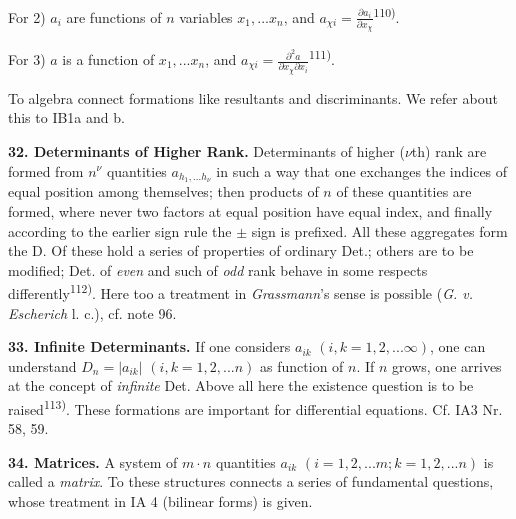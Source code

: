 \thispagestyle{fancy}

\vspace{0.5cm}

For 2) $a_i$ are functions of $n$ variables $x_1,...x_n$, and $a_{\chi i} = \frac{\partial a_i}{\partial x_\chi}$\textsuperscript{110)}.

For 3) $a$ is a function of $x_1,...x_n$, and $a_{\chi i} = \frac{\partial^2 a}{\partial x_\chi \partial x_i}$\textsuperscript{111)}.

To algebra connect formations like resultants and discriminants. We refer about this to IB1a and b.

\vspace{0.1cm}

\textbf{32. Determinants of Higher Rank.} Determinants of higher ($\nu$th) rank are formed from $n^\nu$ quantities $a_{h_1,...h_\nu}$ in such a way that one exchanges the indices of equal position among themselves; then products of $n$ of these quantities are formed, where never two factors at equal position have equal index, and finally according to the earlier sign rule the $\pm$ sign is prefixed. All these aggregates form the D. Of these hold a series of properties of ordinary Det.; others are to be modified; Det. of \textit{even} and such of \textit{odd} rank behave in some respects differently\textsuperscript{112)}. Here too a treatment in \textit{Grassmann}'s sense is possible (\textit{G. v. Escherich} l. c.), cf. note 96.

\vspace{0.1cm}

\textbf{33. Infinite Determinants.} If one considers $a_{ik}$ $(i,k=1,2,...\infty)$, one can understand $D_n=|a_{ik}|$ $(i,k=1,2,...n)$ as function of $n$. If $n$ grows, one arrives at the concept of \textit{infinite} Det. Above all here the existence question is to be raised\textsuperscript{113)}. These formations are important for differential equations. Cf. IA3 Nr. 58, 59.

\vspace{0.1cm}

\textbf{34. Matrices.} A system of $m \cdot n$ quantities $a_{ik}$ $(i=1,2,...m; k=1,2,...n)$ is called a \textit{matrix}. To these structures connects a series of fundamental questions, whose treatment in IA 4 (bilinear forms) is given.


